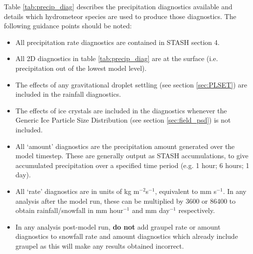 \documentclass{UMDP_article}
\begin{document}
Table \ref{tab:precip_diag} describes the precipitation diagnostics available
and details which hydrometeor species are used to produce those diagnostics. 
The following guidance points should be noted:
\begin{itemize}
\item All precipitation rate diagnostics are contained in STASH section 4. 
\item All 2D diagnostics in table \ref{tab:precip_diag} are at the surface 
(i.e. precipitation out of the lowest model level).
\item The effects of any gravitational droplet settling (see section \ref{sec:PLSET})
are included in the rainfall diagnostics. 
\item The effects of ice crystals are included in the diagnostics whenever the Generic
Ice Particle Size Distribution (see section \ref{sec:field_psd}) is not included.
\item All `amount' diagnostics are the precipitation amount generated over the model 
timestep. These are generally output as STASH accumulations, to give accumulated 
precipitation over a specified time period (e.g. 1 hour; 6 hours; 1 day). 
\item All `rate' diagnostics are in units of kg m$^{-2}$s$^{-1}$, equivalent to mm s$^{-1}$. 
In any analysis after the model run, these can be multiplied by 3600 or 86400 to obtain 
rainfall/snowfall in mm hour$^{-1}$ and mm day$^{-1}$ respectively. 
\item In any analysis post-model run, \textbf{do not} add graupel rate or amount 
diagnostics to snowfall rate and amount diagnostics which already include graupel as this
will make any results obtained incorrect. 

\end{itemize}
\end{document}
